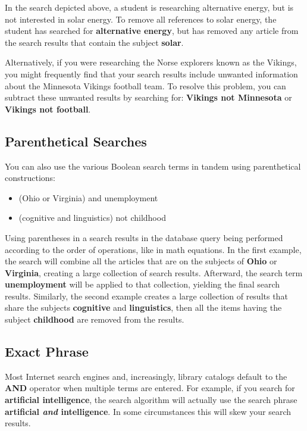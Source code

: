 \documentclass[book]{memoir}
\begin{document}
In the search depicted above, a student is researching alternative energy, but is not interested in solar energy. To remove all references to solar energy, the student has searched for \textbf{alternative energy}, but has removed any article from the search results that contain the subject \textbf{solar}. 

Alternatively, if you were researching the Norse explorers known as the Vikings, you might frequently find that your search results include unwanted information about the Minnesota Vikings football team. To resolve this problem, you can subtract these unwanted results by searching for: \textbf{Vikings not Minnesota} or \textbf{Vikings not football}.  

\subsection{Parenthetical Searches}

You can also use the various Boolean search terms in tandem using parenthetical constructions:

\begin{itemize}
\item (Ohio or Virginia) and unemployment
\item (cognitive and linguistics) not childhood
\end{itemize}
Using parentheses in a search results in the database query being performed according to the order of operations, like in math equations. In the first example, the search will combine all the articles that are on the subjects of \textbf{Ohio} or \textbf{Virginia}, creating a large collection of search results. Afterward, the search term \textbf{unemployment} will be applied to that collection, yielding the final search results. Similarly, the second example creates a large collection of results that share the subjects \textbf{cognitive} and \textbf{linguistics}, then all the items having the subject \textbf{childhood} are removed from the results.

\subsection{Exact Phrase}

Most Internet search engines and, increasingly, library catalogs default to the \textbf{AND} operator when multiple terms are entered. For example, if you search for \textbf{artificial intelligence}, the search algorithm will actually use the search phrase \textbf{artificial \emph{and} intelligence}. In some circumstances this will skew your search results.
\end{document}
